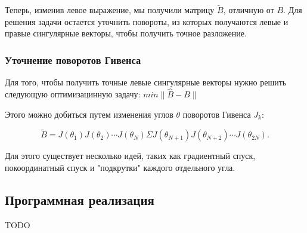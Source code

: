 Теперь, изменив левое выражение, мы получили матрицу $\tilde{B}$, отличную от $B$. Для решения задачи остается уточнить повороты, из которых получаются левые и правые сингулярные векторы, чтобы получить точное разложение.

\subsubsection{Уточнение поворотов Гивенса}

Для того, чтобы получить точные левые сингулярные векторы нужно решить следующую оптимизацинную задачу:
\( 
min\| \widehat{B} - B \| 
\)

Этого можно добиться путем изменения углов \( \theta \) поворотов Гивенса \( J_k \):

\begin{equation}
\tilde{B} = J(\theta_1) J(\theta_2) \cdots J(\theta_N) \Sigma J(\theta_{N+1}) J(\theta_{N+2}) \cdots J(\theta_{2N}).
\end{equation}

Для этого существует несколько идей, таких как градиентный спуск, покоординатный спуск и "подкрутки" каждого отдельного угла.


\subsection{Программная реализация}

TODO






\newpage
